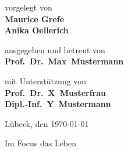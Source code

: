 \begin{titlepage}
{	\titlepageskip
	vorgelegt von\\
	{\bf Maurice Grefe}\\
	{\bf Anika Oellerich}

	\titlepageskip
	ausgegeben und betreut von\\
	{\bf Prof.~Dr.~Max~Mustermann}

	\titlepageskip
	{
		mit Unterstützung von\\
		{\bf Prof.~Dr.~X~Musterfrau}\\
		{\bf Dipl.-Inf.~Y~Mustermann}\\
	}

	\titlepageskip
	{
	}

	\vfill 
	{
		Lübeck, den \today
	}

	{
		\titlepageskip
		Im Focus das Leben
	}
}
\end{titlepage}
\restoregeometry

\cleardoublepage

\begin{comment}
\newpage
\vspace*{7cm}
\centerline{\bf Erkl"arung}

\vspace*{1cm}
Ich versichere an Eides statt, die vorliegende Arbeit selbstst"andig und nur unter Benutzung
der angegebenen Hilfsmittel angefertigt zu haben.

\vspace*{3cm}
Lübeck, den \today 

\pagestyle{headings}

\cleardoublepage
\end{comment}

